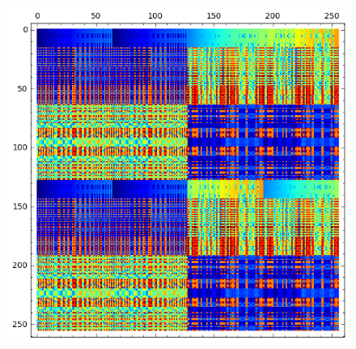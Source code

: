 \documentclass[12pt,a4paper]{article}
\begin{document}
\begin{figure}[!hb]
\begin{minipage}{.48\textwidth}
  \label{fig:cast128_5_16_bent_cayley_graph_index_matrix}
\end{minipage}%
\end{figure}
\begin{figure}[!ht]
\centering
\begin{minipage}{.48\textwidth}
  \centering
\includegraphics[width=.9\linewidth]{../matrix_plot/cast128_5_27_bent_cayley_graph_index_matrix.png}
  \label{fig:cast128_5_27_bent_cayley_graph_index_matrix}
\end{minipage}%
\begin{minipage}{.48\textwidth}
  \centering

\end{minipage}
\end{figure}
\end{document}
